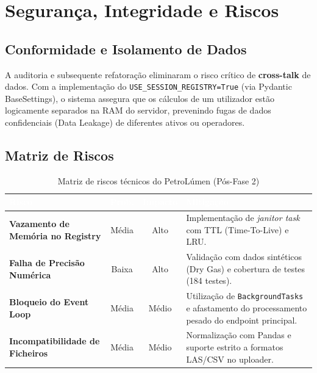 \documentclass[12pt,a4paper]{article}
\renewcommand{\arraystretch}{1.15}
\begin{document}
\section{Segurança, Integridade e Riscos}

\subsection{Conformidade e Isolamento de Dados}

A auditoria e subsequente refatoração eliminaram o risco crítico de \textbf{cross-talk} de dados. Com a implementação do \texttt{USE\_SESSION\_REGISTRY=True} (via Pydantic BaseSettings), o sistema assegura que os cálculos de um utilizador estão logicamente separados na RAM do servidor, prevenindo fugas de dados confidenciais (Data Leakage) de diferentes ativos ou operadores.

\subsection{Matriz de Riscos}

\begin{table}[H]
\centering
\renewcommand{\arraystretch}{1.3}
\small
\begin{tabularx}{\textwidth}{>{\bfseries}p{3.5cm} c c X}
\toprule
\rowcolor{tableheader}
\textcolor{white}{\textbf{Risco}} & \textcolor{white}{\textbf{Prob.}} & \textcolor{white}{\textbf{Impacto}} & \textcolor{white}{\textbf{Mitigação}} \\
\midrule
Vazamento de Memória no Registry & Média & Alto & Implementação de \textit{janitor task} com TTL (Time-To-Live) e LRU.\\
Falha de Precisão Numérica & Baixa & Alto & Validação com dados sintéticos (Dry Gas) e cobertura de testes (184 testes).\\
Bloqueio do Event Loop & Média & Médio & Utilização de \texttt{BackgroundTasks} e afastamento do processamento pesado do endpoint principal.\\
Incompatibilidade de Ficheiros & Média & Médio & Normalização com Pandas e suporte estrito a formatos LAS/CSV no uploader.\\
\bottomrule
\end{tabularx}
\caption{Matriz de riscos técnicos do PetroLúmen (Pós-Fase 2)}
\end{table}
\end{document}
